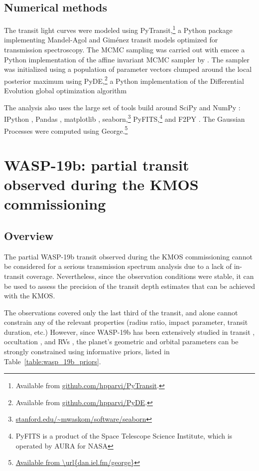 \documentclass[useAMS,usenatbib]{mn2e}
\begin{document}
\subsection{Numerical methods}
\label{sec:analysis:numerical_methods}
The transit light curves were modeled using PyTransit,$\!$\footnote{Available from \url{github.com/hpparvi/PyTransit}.} 
a Python package implementing Mandel-Agol and Gim\'enez transit models optimized for transmission spectroscopy. The 
MCMC sampling was carried out with emcee \citep{Foreman-Mackey2012} a Python implementation of the affine 
invariant MCMC sampler by \cite{Goodman2010}. The sampler was initialized using a population of parameter vectors 
clumped around the local posterior maximum using PyDE,$\!$\footnote{Available from \url{github.com/hpparvi/PyDE}.} a 
Python implementation of the Differential Evolution global optimization algorithm \citep{Storn1997}

The analysis also uses the large set of tools build around SciPy and NumPy \citep{VanderWalt2011}: IPython 
\citep{Perez2007}, Pandas \citep{Mckinney2010}, matplotlib \citep{Hunter2007}, 
seaborn,$\!$\footnote{\url{stanford.edu/~mwaskom/software/seaborn}} PyFITS,$\!$\footnote{PyFITS is a product of the
Space 
Telescope Science Institute, which is operated by AURA for NASA} and F2PY \citep{Peterson2009}. The Gaussian Processes 
were computed using George.$\!$\footnote{\url{Available from \url{dan.iel.fm/george}}} \citep{Ambikasaran2014}


\section{WASP-19b: partial transit observed during the KMOS commissioning}
\label{sec:wasp_19b}
\subsection{Overview}
\label{sec:wasp_19b:overview}
The partial WASP-19b transit observed during the KMOS commissioning cannot be considered for a serious transmission 
spectrum analysis due to a lack of in-transit coverage. Nevertheless, since the observation conditions were stable, it 
can be used to assess the precision of the transit depth estimates that can be achieved with the KMOS.

The observations covered only the last third of the transit, and alone cannot constrain any of the relevant properties
(radius ratio, impact parameter, transit duration, etc.) However, since WASP-19b has been extensively studied in 
transit \citep{Hebb2010,Bean2013,Mancini2013,Mandell2013,Huitson2013,Tregloan-Reed2012}, occultation 
\citep{Gibson2010,Mancini2013,Anderson2013a}, and RVs \citep{Hellier2011a}, the planet's geometric and orbital 
parameters can be strongly constrained using informative priors, listed in Table~\ref{table:wasp_19b_priors}.
\end{document}
